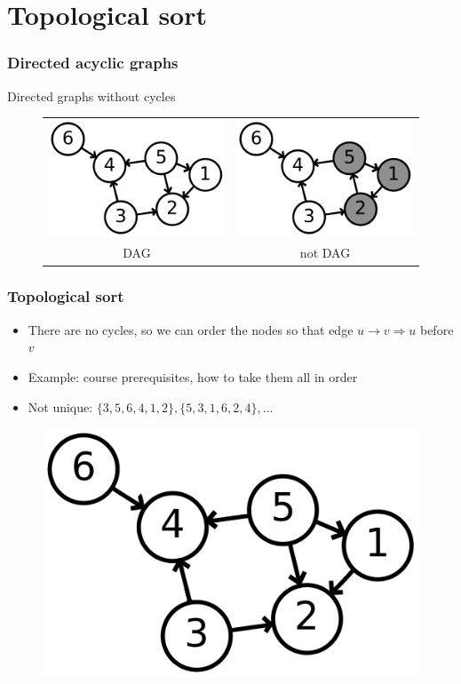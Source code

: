 \documentclass[12pt]{beamer}
\begin{document}
\section{Topological sort}

\begin{frame}
\frametitle{Directed acyclic graphs}
Directed graphs without cycles
\begin{figure}
\centering
\begin{tabular}{cc}
\includegraphics[width=0.4\linewidth]{img/6n-dag}
& \includegraphics[width=0.4\linewidth]{img/6n-not-dag} \\
DAG & not DAG
\end{tabular}
\end{figure}
\end{frame}

\begin{frame}
\frametitle{Topological sort}
\begin{itemize}
\item There are no cycles, so we can order the nodes so that edge $u \to v \Rightarrow  u$ before $v$
\item Example: course prerequisites, how to take them all in order
\item Not unique: $\{3,5,6,4,1,2\}, \{5,3,1,6,2,4\},\ldots$
\end{itemize}
\begin{figure}
\centering
\includegraphics[width=.5\linewidth]{img/6n-dag}
\end{figure}
\end{frame}
\end{document}
